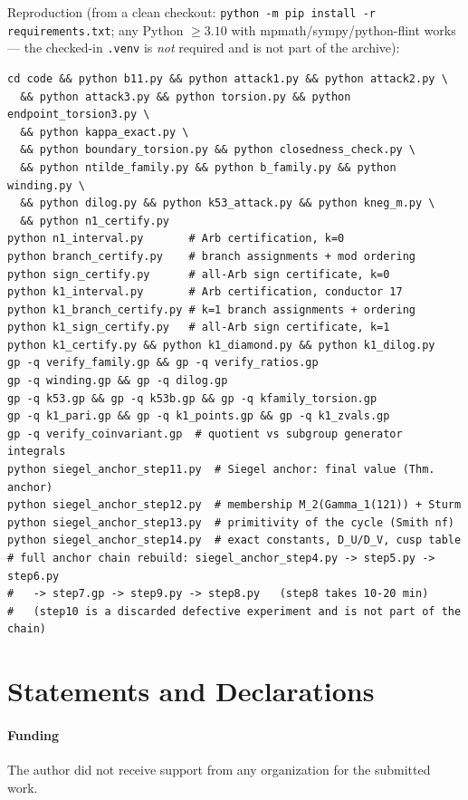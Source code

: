 \documentclass[11pt]{amsart}
\theoremstyle{definition}
\theoremstyle{remark}
\begin{document}
Reproduction (from a clean checkout:
\texttt{python -m pip install -r requirements.txt}; any Python $\ge3.10$
with mpmath/sympy/python-flint works --- the checked-in \texttt{.venv} is
\emph{not} required and is not part of the archive):
{\footnotesize
\begin{verbatim}
cd code && python b11.py && python attack1.py && python attack2.py \
  && python attack3.py && python torsion.py && python endpoint_torsion3.py \
  && python kappa_exact.py \
  && python boundary_torsion.py && python closedness_check.py \
  && python ntilde_family.py && python b_family.py && python winding.py \
  && python dilog.py && python k53_attack.py && python kneg_m.py \
  && python n1_certify.py
python n1_interval.py       # Arb certification, k=0
python branch_certify.py    # branch assignments + mod ordering
python sign_certify.py      # all-Arb sign certificate, k=0
python k1_interval.py       # Arb certification, conductor 17
python k1_branch_certify.py # k=1 branch assignments + ordering
python k1_sign_certify.py   # all-Arb sign certificate, k=1
python k1_certify.py && python k1_diamond.py && python k1_dilog.py
gp -q verify_family.gp && gp -q verify_ratios.gp
gp -q winding.gp && gp -q dilog.gp
gp -q k53.gp && gp -q k53b.gp && gp -q kfamily_torsion.gp
gp -q k1_pari.gp && gp -q k1_points.gp && gp -q k1_zvals.gp
gp -q verify_coinvariant.gp  # quotient vs subgroup generator integrals
python siegel_anchor_step11.py  # Siegel anchor: final value (Thm. anchor)
python siegel_anchor_step12.py  # membership M_2(Gamma_1(121)) + Sturm
python siegel_anchor_step13.py  # primitivity of the cycle (Smith nf)
python siegel_anchor_step14.py  # exact constants, D_U/D_V, cusp table
# full anchor chain rebuild: siegel_anchor_step4.py -> step5.py -> step6.py
#   -> step7.gp -> step9.py -> step8.py   (step8 takes 10-20 min)
#   (step10 is a discarded defective experiment and is not part of the chain)
\end{verbatim}
}

\section*{Statements and Declarations}

\paragraph{Funding} The author did not receive support from any
organization for the submitted work.
\end{document}
